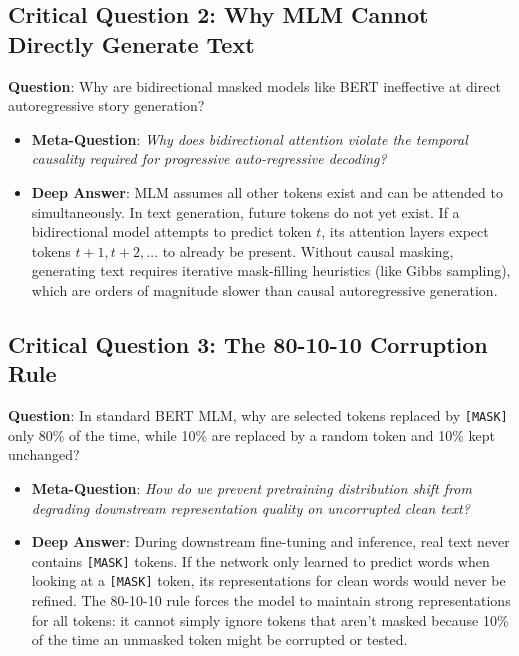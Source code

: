 \documentclass[11pt,a4paper]{article}
\theoremstyle{definition}
\begin{document}
\subsection{\textbf{Critical Question 2: Why MLM Cannot Directly Generate Text}}
\textbf{Question}: Why are bidirectional masked models like BERT ineffective at direct autoregressive story generation?
\begin{itemize}
    \item \textbf{Meta-Question}: \emph{Why does bidirectional attention violate the temporal causality required for progressive auto-regressive decoding?}
    \item \textbf{Deep Answer}: MLM assumes all other tokens exist and can be attended to simultaneously. In text generation, future tokens do not yet exist. If a bidirectional model attempts to predict token $t$, its attention layers expect tokens $t+1, t+2, \dots$ to already be present. Without causal masking, generating text requires iterative mask-filling heuristics (like Gibbs sampling), which are orders of magnitude slower than causal autoregressive generation.
\end{itemize}

\subsection{\textbf{Critical Question 3: The 80-10-10 Corruption Rule}}
\textbf{Question}: In standard BERT MLM, why are selected tokens replaced by \texttt{[MASK]} only 80\% of the time, while 10\% are replaced by a random token and 10\% kept unchanged?
\begin{itemize}
    \item \textbf{Meta-Question}: \emph{How do we prevent pretraining distribution shift from degrading downstream representation quality on uncorrupted clean text?}
    \item \textbf{Deep Answer}: During downstream fine-tuning and inference, real text never contains \texttt{[MASK]} tokens. If the network only learned to predict words when looking at a \texttt{[MASK]} token, its representations for clean words would never be refined. The 80-10-10 rule forces the model to maintain strong representations for all tokens: it cannot simply ignore tokens that aren't masked because 10\% of the time an unmasked token might be corrupted or tested.
\end{itemize}
\end{document}
